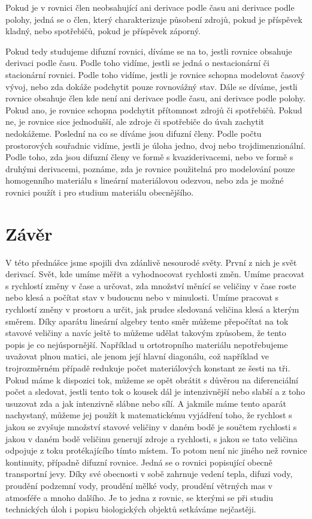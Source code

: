 \documentclass[12pt]{article}
\begin{document}
Pokud je v rovnici člen neobsahující ani derivace podle času ani derivace podle polohy, jedná se o člen, který charakterizuje působení zdrojů, pokud je příspěvek kladný, nebo spotřebičů, pokud je příspěvek záporný.

Pokud tedy studujeme difuzní rovnici, díváme se na to, jestli rovnice obsahuje derivaci podle času. Podle toho vidíme, jestli se jedná o nestacionární či stacionární rovnici. Podle toho vidíme, jestli je rovnice schopna modelovat časový vývoj, nebo zda dokáže podchytit pouze rovnovážný stav. Dále se díváme, jestli rovnice obsahuje člen kde není ani derivace podle času, ani derivace podle polohy. Pokud ano, je rovnice schopna podchytit přítomnost zdrojů či spotřebičů. Pokud ne, je rovnice sice jednodušší, ale zdroje či spotřebiče do úvah zachytit nedokážeme. Poslední na co se díváme jsou difuzní členy. Podle počtu prostorových souřadnic vidíme, jestli je úloha jedno, dvoj nebo trojdimenzionální. Podle toho, zda jsou difuzní členy ve formě s kvaziderivacemi, nebo ve formě s druhými derivacemi, poznáme, zda je rovnice použitelná pro modelování pouze homogenního materiálu s lineární materiálovou odezvou, nebo zda je možné rovnici použít i pro studium materiálu obecnějšího. 

\section{Závěr}

V této přednášce jsme spojili dva zdánlivě nesourodé světy. První z nich je svět derivací. Svět, kde umíme měřit a vyhodnocovat rychlosti změn. Umíme pracovat s rychlostí změny v čase a určovat, zda množství měnící se veličiny v čase roste nebo klesá a počítat stav v budoucnu nebo v minulosti. Umíme pracovat s rychlostí změny v prostoru a určit, jak prudce sledovaná veličina klesá a kterým směrem. Díky aparátu lineární algebry tento směr můžeme přepočítat na tok stavové veličiny a navíc ještě to můžeme udělat takovým způsobem, že tento popis je co nejúspornější. Například u ortotropního materiálu nepotřebujeme uvažovat plnou matici, ale jenom její hlavní diagonálu, což například ve trojrozměrném případě redukuje počet materiálových konstant ze šesti na tři. Pokud máme k dispozici tok, můžeme se opět obrátit s důvěrou na diferenciální počet a sledovat, jestli tento tok o kousek dál je intenzivnější nebo slabší a z toho usuzovat zda a jak intenzivně slábne nebo sílí. A jakmile máme tento aparát nachystaný, můžeme jej použít k matematickému vyjádření toho, že rychlost s jakou se zvyšuje množství stavové veličiny v daném bodě je součtem rychlosti s jakou v daném bodě veličinu generují zdroje a rychlosti, s jakou se tato veličina odpojuje z toku protékajícího tímto místem. To potom není nic jiného než rovnice kontinuity, případně difuzní rovnice. Jedná se o rovnici popisující obecně transportní jevy. Díky své obecnosti v sobě zahrnuje vedení tepla, difuzi vody, proudění podzemní vody, proudění mělké vody, proudění větrných mas v atmosféře a mnoho dalšího. Je to jedna z rovnic, se kterými se při studiu technických úloh i popisu biologických objektů setkáváme nejčastěji.
\end{document}
